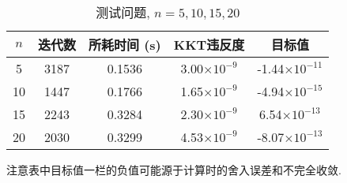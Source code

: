 \begin{table}[htbp]
	\renewcommand{\captionfont}{\small}
	\centering
	\caption{测试问题, $n=5,10,15,20$}
	\label{test}
	\vskip 4mm
	\begin{tabular}{c|c|c|c|c}
		\hline
		$n$ & 迭代数 & 所耗时间 (s) & KKT违反度 & 目标值\\\hline
		5 & 3187 & 0.1536 & 3.00$\times10^{-9}$ & -1.44$\times10^{-11}$\\\hline
		10 & 1447 & 0.1766 & 1.65$\times10^{-9}$ & -4.94$\times10^{-15}$\\\hline
		15 & 2243 & 0.3284 & 2.30$\times10^{-9}$ & 6.54$\times10^{-13}$\\\hline
		20 & 2030 & 0.3299 & 4.53$\times10^{-9}$ & -8.07$\times10^{-13}$\\\hline
	\end{tabular}
\end{table}
\par 注意表中目标值一栏的负值可能源于计算时的舍入误差和不完全收敛.

